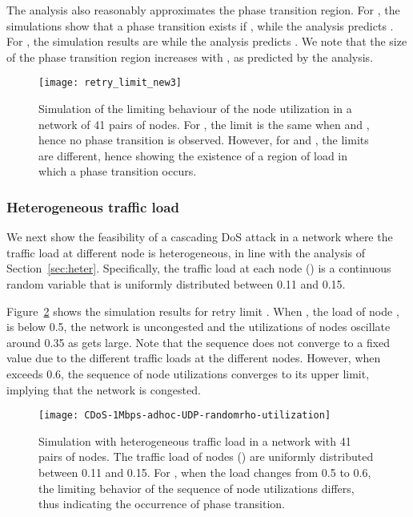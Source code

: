 \documentclass{IEEEtran}
\begin{document}
The analysis also reasonably approximates the phase transition region. For , the simulations show that a phase transition exists if , while the analysis predicts . For , the simulation results are  while the analysis
predicts . We note that the size of the phase transition region increases with , as predicted by the analysis.

\begin{figure}[!t]
\centering
\texttt{[image: retry\_limit\_new3]}
\caption{Simulation of the limiting behaviour of the node utilization in a network of 41 pairs of nodes. For , the limit is the same when
 and , hence no phase transition is observed. However, for  and ,
the limits are different, hence showing the existence of a region of load  in which a phase transition occurs. }
\label{retry_limit}
\end{figure}


\subsubsection{Heterogeneous traffic load}
\label{validation of Heterogeneous traffic load}
We next show the feasibility of a cascading DoS attack in
a network where the traffic load at different node is heterogeneous, in line with the analysis of Section~\ref{sec:heter}. 
Specifically,  the traffic load  at each node   () is a continuous random variable that is uniformly distributed between 0.11 and
0.15.

Figure~\ref{CDoS-1Mbps-adhoc-UDP-randomrho-utilization} shows the simulation results for retry limit . 
When , the load of node ,   is below 0.5, the network is uncongested and the utilizations of nodes  oscillate around 0.35 as  gets large. Note that the sequence does not converge to a fixed value due to the different traffic loads at the different nodes.
However, when  exceeds 0.6, the sequence of node utilizations converges to its upper limit, implying that the network is congested. 


\begin{figure}[!t]
\centering
\texttt{[image: CDoS-1Mbps-adhoc-UDP-randomrho-utilization]}
\caption{Simulation with heterogeneous traffic load in a network with 41 pairs of nodes. The traffic load of nodes  () are uniformly
distributed between 0.11 and 0.15. For , when the load  changes from 0.5 to 0.6, the limiting behavior of the sequence of node utilizations differs, thus indicating the occurrence of phase transition.}
\label{CDoS-1Mbps-adhoc-UDP-randomrho-utilization}
\end{figure}
\end{document}
